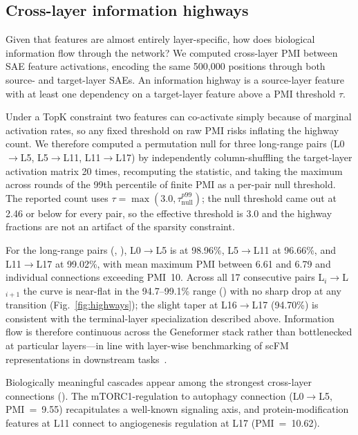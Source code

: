 \documentclass[onecolumn,11pt]{article}
\begin{document}
\subsection*{Cross-layer information highways}
\label{sec:highways}

Given that features are almost entirely layer-specific, how does biological information flow
through the network? We computed cross-layer PMI between SAE feature activations, encoding the same
500,000 positions through both source- and target-layer SAEs. An information highway is a
source-layer feature with at least one dependency on a target-layer feature above a PMI threshold
$\tau$.

Under a TopK constraint two features can co-activate simply because of marginal activation rates,
so any fixed threshold on raw PMI risks inflating the highway count. We therefore computed a
permutation null for three long-range pairs (L0$\to$L5, L5$\to$L11, L11$\to$L17) by independently
column-shuffling the target-layer activation matrix 20 times, recomputing the statistic, and taking
the maximum across rounds of the 99th percentile of finite PMI as a per-pair null threshold. The
reported count uses $\tau = \max(3.0, \tau_{\text{null}}^{p99})$; the null threshold came out at
2.46 or below for every pair, so the effective threshold is 3.0 and the highway fractions are not
an artifact of the sparsity constraint.

For the long-range pairs (, ), L0$\to$L5 is at 98.96\%,
L5$\to$L11 at 96.66\%, and L11$\to$L17 at 99.02\%, with mean maximum PMI between 6.61 and 6.79 and individual connections exceeding PMI~10.
Across all 17 consecutive pairs L$_{i}$$\to$L$_{i+1}$ the curve is near-flat in the 94.7--99.1\%
range () with no sharp drop at any transition (Fig.~\ref{fig:highways}); the slight taper at
L16$\to$L17 (94.70\%) is consistent with the terminal-layer specialization described above.
Information flow is therefore continuous across the Geneformer stack rather than bottlenecked at
particular layers---in line with layer-wise benchmarking of scFM representations in downstream
tasks~\cite{wang2025scdrugmap}.

Biologically meaningful cascades appear among the strongest cross-layer connections
(). The mTORC1-regulation to autophagy connection (L0$\to$L5, PMI~=~9.55) recapitulates a well-known
signaling axis, and protein-modification features at L11 connect to angiogenesis regulation at L17
(PMI~=~10.62).
\end{document}

